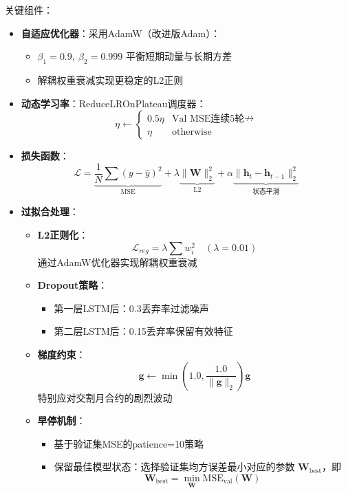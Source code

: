 \documentclass[a4paper,11pt]{ctexart}
\begin{document}
关键组件：
\begin{itemize}
\item \textbf{自适应优化器}：采用AdamW（改进版Adam）：
  \begin{itemize}
  \item $\beta_1=0.9,\ \beta_2=0.999$ 平衡短期动量与长期方差
  \item 解耦权重衰减实现更稳定的L2正则
  \end{itemize}
  
\item \textbf{动态学习率}：ReduceLROnPlateau调度器：
  \[
  \eta \leftarrow \begin{cases}
  0.5\eta & \text{Val MSE连续5轮$\nrightarrow$} \\
  \eta & \text{otherwise}
  \end{cases}
  \]
  
\item \textbf{损失函数}：
  \[
  \mathcal{L} = \underbrace{\frac{1}{N}\sum(y-\hat{y})^2}_{\text{MSE}} + \lambda \underbrace{\|\mathbf{W}\|_2^2}_{\text{L2}} + \alpha \underbrace{\|\mathbf{h}_t-\mathbf{h}_{t-1}\|_2^2}_{\text{状态平滑}}
  \]

  \item \textbf{过拟合处理}：

  \begin{itemize}
  \item \textbf{L2正则化}：
    \[
    \mathcal{L}_{reg} = \lambda\sum w_i^2 \quad (\lambda=0.01)
    \]
    通过AdamW优化器实现解耦权重衰减
    
  \item \textbf{Dropout策略}：
    \begin{itemize}
    \item 第一层LSTM后：0.3丢弃率过滤噪声
    \item 第二层LSTM后：0.15丢弃率保留有效特征
    \end{itemize}
  
  \item \textbf{梯度约束}：
    \[
    \mathbf{g} \leftarrow \min\left(1.0, \frac{1.0}{\|\mathbf{g}\|_2}\right)\mathbf{g}
    \]
    特别应对交割月合约的剧烈波动
  
  
  \item \textbf{早停机制}：
  \begin{itemize}
  \item 基于验证集MSE的patience=10策略
    \item 保留最佳模型状态：选择验证集均方误差最小对应的参数 $\mathbf{W}_{\text{best}}$，即
        \[
        \mathbf{W}_{\text{best}} = \min_{\mathbf{W}} \text{MSE}_{\text{val}}(\mathbf{W})
        \]
  \end{itemize}
  \end{itemize}
  

\end{itemize}
\end{document}
